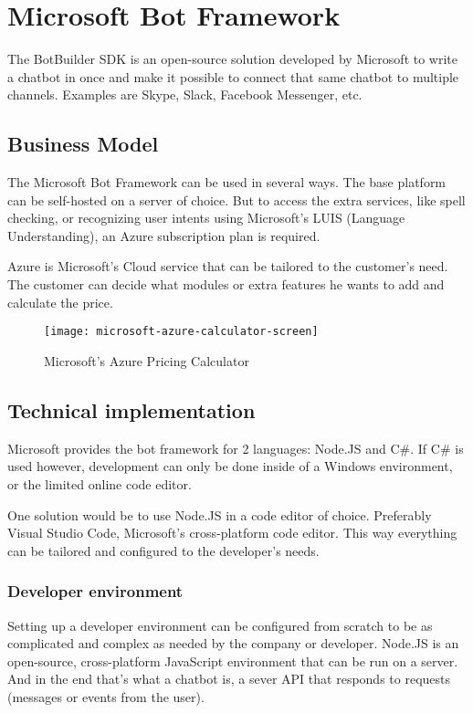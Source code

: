 \chapter{Microsoft Bot Framework}

The BotBuilder SDK is an open-source solution developed by Microsoft to write a chatbot in once and make it possible to connect that same chatbot to multiple channels. Examples are Skype, Slack, Facebook Messenger, etc.

\section{Business Model}

The Microsoft Bot Framework can be used in several ways. The base platform can be self-hosted on a server of choice. But to access the extra services, like spell checking, or recognizing user intents using Microsoft's LUIS (Language Understanding), an Azure subscription plan is required.

Azure is Microsoft's Cloud service that can be tailored to the customer's need. The customer can decide what modules or extra features he wants to add and calculate the price.

\begin{figure}[ht]
	\centering
	\texttt{[image: microsoft-azure-calculator-screen]}\label{fig:microsoft-azure-calculator-screen}
	\caption{Microsoft's Azure Pricing Calculator~\cite{azure-pricing-calculator}}
\end{figure}

\section{Technical implementation}

Microsoft provides the bot framework for 2 languages: Node.JS and C\#. If C\# is used however, development can only be done inside of a Windows environment, or the limited online code editor.

One solution would be to use Node.JS in a code editor of choice. Preferably Visual Studio Code, Microsoft's cross-platform code editor. This way everything can be tailored and configured to the developer's needs.

\subsection{Developer environment}

Setting up a developer environment can be configured from scratch to be as complicated and complex as needed by the company or developer. Node.JS is an open-source, cross-platform JavaScript environment that can be run on a server. And in the end that's what a chatbot is, a sever API that responds to requests (messages or events from the user).

